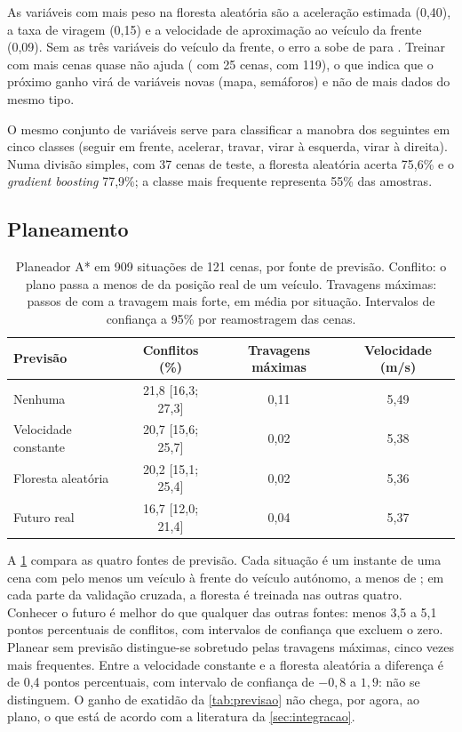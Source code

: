 As variáveis com mais peso na floresta aleatória são a aceleração
estimada (0,40), a taxa de viragem (0,15) e a velocidade de aproximação
ao veículo da frente (0,09). Sem as três variáveis do veículo da frente,
o erro a  sobe de  para . Treinar com
mais cenas quase não ajuda ( com 25 cenas,  com
119), o que indica que o próximo ganho virá de variáveis novas (mapa,
semáforos) e não de mais dados do mesmo tipo.

O mesmo conjunto de variáveis serve para classificar a manobra dos
 seguintes em cinco classes (seguir em frente, acelerar, travar,
virar à esquerda, virar à direita). Numa divisão simples, com 37 cenas de
teste, a floresta aleatória acerta 75,6\% e o \emph{gradient boosting}
77,9\%; a classe mais frequente representa 55\% das amostras.

\subsection{Planeamento}


\begin{table}[t]
\centering
\caption{Planeador A* em 909 situações de 121 cenas, por fonte de
  previsão. Conflito: o plano passa a menos de  da posição
  real de um veículo. Travagens máximas: passos de  com a
  travagem mais forte, em média por situação. Intervalos de confiança a
  95\% por reamostragem das cenas.}
\label{tab:planeamento}
\begin{tabular*}{\textwidth}{@{\extracolsep{\fill}}lccc@{}}
\toprule
Previsão & Conflitos (\%) & Travagens máximas & Velocidade (m/s) \\
\midrule
Nenhuma & 21,8 [16,3; 27,3] & 0,11 & 5,49 \\
Velocidade constante & 20,7 [15,6; 25,7] & 0,02 & 5,38 \\
Floresta aleatória & 20,2 [15,1; 25,4] & 0,02 & 5,36 \\
Futuro real & 16,7 [12,0; 21,4] & 0,04 & 5,37 \\
\bottomrule
\end{tabular*}
\end{table}

A \cref{tab:planeamento} compara as quatro fontes de previsão. Cada
situação é um instante de uma cena com pelo menos um veículo à frente do
veículo autónomo, a menos de ; em cada parte da validação
cruzada, a floresta é treinada nas outras quatro. Conhecer o futuro é
melhor do que qualquer das outras fontes: menos 3,5 a 5,1 pontos
percentuais de conflitos, com intervalos de confiança que excluem o zero.
Planear sem previsão distingue-se sobretudo pelas travagens máximas,
cinco vezes mais frequentes. Entre a velocidade constante e a floresta
aleatória a diferença é de 0,4 pontos percentuais, com intervalo de
confiança de $-0,8$ a $1,9$: não se distinguem. O ganho de exatidão da
\cref{tab:previsao} não chega, por agora, ao plano, o que está de acordo
com a literatura da \cref{sec:integracao}.

